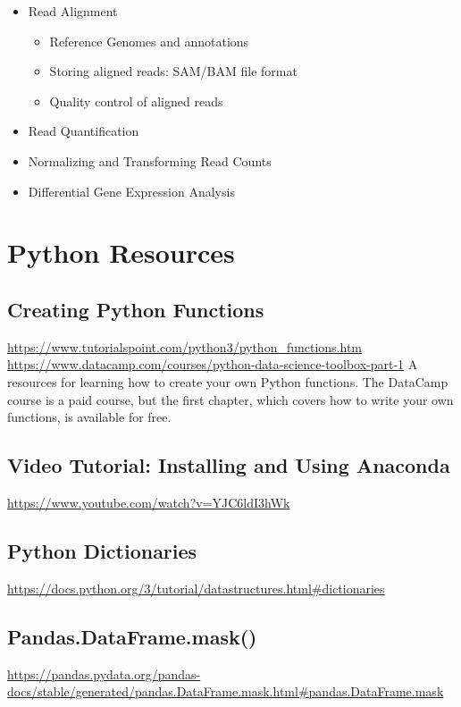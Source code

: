 \begin{fullpage}
\begin{itemize}
\begin{itemize}
\end{itemize}

    \item Read Alignment 
\begin{itemize}
\item Reference Genomes and annotations
\item Storing aligned reads: SAM/BAM file format
\item Quality control of aligned reads
\end{itemize}

    \item Read Quantification
    \item Normalizing and Transforming Read Counts
    \item Differential Gene Expression Analysis
		

\end{itemize}


%
\chapter{Python Resources}
\label{chap:python-resources}

\section{Creating Python Functions}
\label{appendix:create-func}
\url{https://www.tutorialspoint.com/python3/python_functions.htm}\newline
\url{https://www.datacamp.com/courses/python-data-science-toolbox-part-1}
A resources for learning how to create your own Python functions. The DataCamp course is a paid course, but the first chapter, which covers how to write your own functions, is available for free.


\section{Video Tutorial: Installing and Using Anaconda}
\label{appendix:install-anaconda}
\url{https://www.youtube.com/watch?v=YJC6ldI3hWk}


\section{Python Dictionaries}
\label{appendix:python-dictionaries}
\url{https://docs.python.org/3/tutorial/datastructures.html#dictionaries}


\section{Pandas.DataFrame.mask()}
\url{https://pandas.pydata.org/pandas-docs/stable/generated/pandas.DataFrame.mask.html#pandas.DataFrame.mask}


\end{fullpage}

